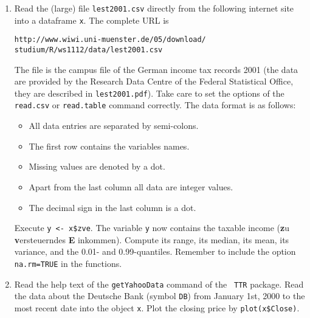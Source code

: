 \documentclass{article}
\begin{document}
\begin{enumerate}
\item Read the (large) file \texttt{lest2001.csv} directly from the following internet
site into a dataframe \texttt{x}. The complete URL is

\texttt{http://www.wiwi.uni-muenster.de/05/download/}\newline
\texttt{studium/R/ws1112/data/lest2001.csv}

The file is the campus file of the German income tax records 2001 (the data
are provided by the Research Data Centre of the Federal Statistical Office,
they are described in \texttt{lest2001.pdf}). Take care to set the options
of the \texttt{read.csv} or \texttt{read.table} command correctly. The data
format is as follows:

\begin{itemize}
\item All data entries are separated by semi-colons.

\item The first row contains the variables names.

\item Missing values are denoted by a dot.

\item Apart from the last column all data are integer values.

\item The decimal sign in the last column is a dot.
\end{itemize}

Execute \texttt{y <- x\$zve}. The variable \texttt{y} now
contains the taxable income (\textbf{z}u \textbf{v}ersteuerndes \textbf{E}%
inkommen). Compute its range, its median, its mean, its variance, and the
0.01- and 0.99-quantiles. Remember to include the option \texttt{na.rm=TRUE}
in the functions.

\item Read the help text of the \texttt{getYahooData} command of the \texttt{%
TTR} package. Read the data about the Deutsche Bank (symbol \texttt{DB})
from January 1st, 2000 to the most recent date into the object \texttt{x}.
Plot the closing price by \texttt{plot(x\$Close)}.

\end{enumerate}
\newpage
\end{document}
